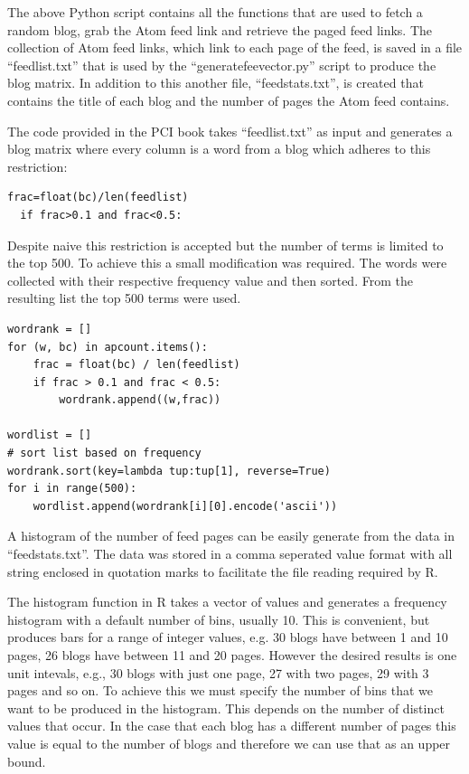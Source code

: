 The above Python script contains all the functions that are used to fetch a random blog, grab the Atom feed link and retrieve the paged feed links. The collection of Atom feed links, which link to each page of the feed, is saved in a file ``feedlist.txt'' that is used by the ``generatefeevector.py'' script to produce the blog matrix. In addition to this another file, ``feedstats.txt'', is created that contains the title of each blog and the number of pages the Atom feed contains. 


The code provided in the PCI book \cite{PCI} takes ``feedlist.txt'' as input and generates a blog matrix where every column is a word from a blog which adheres to this restriction:


\begin{lstlisting}
frac=float(bc)/len(feedlist)
  if frac>0.1 and frac<0.5:
\end{lstlisting}


Despite naive this restriction is accepted but the number of terms is limited to the top 500. To achieve this a small modification was required. The words were collected with their respective frequency value and then sorted. From the resulting list the top 500 terms were used.


\begin{lstlisting}
wordrank = []
for (w, bc) in apcount.items():
    frac = float(bc) / len(feedlist)
    if frac > 0.1 and frac < 0.5:
        wordrank.append((w,frac))

wordlist = []
# sort list based on frequency
wordrank.sort(key=lambda tup:tup[1], reverse=True)
for i in range(500):
    wordlist.append(wordrank[i][0].encode('ascii'))

\end{lstlisting}

A histogram of the number of feed pages can be easily generate from the data in ``feedstats.txt''. The data was stored in a comma seperated value format with all string enclosed in quotation marks to facilitate the file reading required by R.

The histogram function in R takes a vector of values and generates a frequency histogram with a default number of bins, usually 10. This is convenient, but produces bars for a range of integer values, e.g. 30 blogs have between 1 and 10 pages, 26 blogs have between 11 and 20 pages. However the desired results is one unit intevals, e.g., 30 blogs with just one page, 27 with two pages, 29 with 3 pages and so on. To achieve this we must specify the number of bins that we want to be produced in the histogram. This depends on the number of distinct values that occur.   In the case that each blog has a different number of pages this value is equal to the number of blogs and therefore we can use that as an upper bound.

